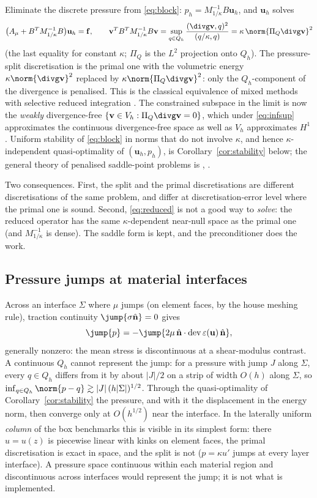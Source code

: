 \documentclass[11pt]{article}
\numberwithin{equation}{section}
\theoremstyle{remark}
\newcommand{\eps}{\varepsilon}
\newcommand{\dev}{\operatorname{dev}}
\newcommand{\vu}{\mathbf{u}}
\newcommand{\vv}{\mathbf{v}}
\newcommand{\vn}{\hat{\mathbf{n}}}
\newcommand{\vf}{\mathbf{f}}
\newcommand{\Amu}{A_{\mu}}
\newcommand{\Mk}{M_{1/\kappa}}
\newcommand{\Vh}{V_h}
\newcommand{\Qh}{Q_h}
\newcommand{\Pq}{\Pi_{Q}}
\begin{document}
Eliminate the discrete pressure from \eqref{eq:block}: $p_h =
\Mk^{-1}B\vu_h$, and $\vu_h$ solves
\begin{equation}
  \bigl(\Amu + B^T\Mk^{-1}B\bigr)\vu_h = \vf ,
  \qquad
  \vv^TB^T\Mk^{-1}B\vv = \sup_{q\in\Qh}\frac{(\divg\vv,q)^2}{(q/\kappa,q)}
  = \kappa\,\norm{\Pq\divg\vv}^2
  \label{eq:reduced}
\end{equation}
(the last equality for constant $\kappa$; $\Pq$ is the $L^2$ projection
onto $\Qh$). The pressure-split discretisation is the primal one with the
volumetric energy $\kappa\norm{\divg\vv}^2$ replaced by
$\kappa\norm{\Pq\divg\vv}^2$: only the $\Qh$-component of the divergence
is penalised. This is the classical equivalence of mixed methods with
selective reduced integration \cite{MalkusHughes1978}. The constrained
subspace in the limit is now the \emph{weakly} divergence-free
$\{\vv\in\Vh : \Pq\divg\vv = 0\}$, which under \eqref{eq:infsup}
approximates the continuous divergence-free space as well as $\Vh$
approximates $H^1$ \cite[\S5.1]{BBF}. Uniform stability of
\eqref{eq:block} in norms that do not involve $\kappa$, and hence
$\kappa$-independent quasi-optimality of $(\vu_h,p_h)$, is
Corollary~\ref{cor:stability} below; the general theory of penalised
saddle-point problems is \cite[Ch.~III \S4]{Braess},
\cite[\S4.3]{BBF}.

Two consequences. First, the split and the primal discretisations are
different discretisations of the same problem, and differ at
discretisation-error level where the primal one is sound. Second,
\eqref{eq:reduced} is not a good way to \emph{solve}: the reduced operator
has the same $\kappa$-dependent near-null space as the primal one (and
$\Mk^{-1}$ is dense). The saddle form is kept, and the preconditioner
does the work.

\subsection{Pressure jumps at material interfaces}
\label{sec:jump}

Across an interface $\Sigma$ where $\mu$ jumps (on element faces, by the
house meshing rule), traction continuity $\jump{\sigma\vn} = 0$ gives
\begin{equation}
  \jump{p} = -\jump{2\mu\,\vn\cdot\dev\eps(\vu)\,\vn},
\end{equation}
generally nonzero: the mean stress is discontinuous at a shear-modulus
contrast. A continuous $\Qh$ cannot represent the jump: for a pressure with
jump $J$ along $\Sigma$, every $q\in\Qh$ differs from it by about $|J|/2$
on a strip of width $O(h)$ along $\Sigma$, so
$\inf_{q\in\Qh}\norm{p - q}\gtrsim|J|\,(h|\Sigma|)^{1/2}$. Through the
quasi-optimality of Corollary~\ref{cor:stability} the pressure, and with
it the displacement in the energy norm, then converge only at
$O(h^{1/2})$ near the interface. In the laterally uniform \emph{column}
of the box benchmarks this is visible in its simplest form: there $u =
u(z)$ is piecewise linear with kinks on element faces, the primal
discretisation is exact in space, and the split is not ($p = \kappa u'$
jumps at every layer interface). A pressure space continuous within each
material region and discontinuous across interfaces would represent the
jump; it is not what is implemented.
\end{document}
